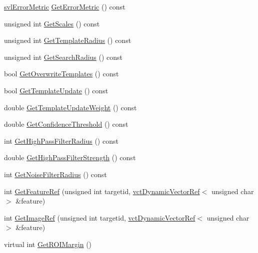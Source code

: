 \begin{DoxyCompactItemize}
\hyperlink{svl_definitions_8h_ade0b97ec3319ac710d7478dd2b608727}{svl\-Error\-Metric} \hyperlink{classsvl_tracker_m_s_brute_force_a05f84e1c56b6e77dc76cd3056a665ee8}{Get\-Error\-Metric} () const 
\item 
unsigned int \hyperlink{classsvl_tracker_m_s_brute_force_a3cd3d398b00a6ab8d6d0a90dcaa465b9}{Get\-Scales} () const 
\item 
unsigned int \hyperlink{classsvl_tracker_m_s_brute_force_ae144e2ee5ab88e36033c692e3a19beb7}{Get\-Template\-Radius} () const 
\item 
unsigned int \hyperlink{classsvl_tracker_m_s_brute_force_a78dc2245729b8d9202613fd6e01513ea}{Get\-Search\-Radius} () const 
\item 
bool \hyperlink{classsvl_tracker_m_s_brute_force_aa740599c31b39776bd4c2ba857439083}{Get\-Overwrite\-Templates} () const 
\item 
bool \hyperlink{classsvl_tracker_m_s_brute_force_aaf206f8acad3a3e4ef2b46dcf8ec7059}{Get\-Template\-Update} () const 
\item 
double \hyperlink{classsvl_tracker_m_s_brute_force_abf556900111a4553a5ae1bd53e7aaa9c}{Get\-Template\-Update\-Weight} () const 
\item 
double \hyperlink{classsvl_tracker_m_s_brute_force_abf7d49bbc65882beded0e10f8012021e}{Get\-Confidence\-Threshold} () const 
\item 
int \hyperlink{classsvl_tracker_m_s_brute_force_a33ca45d65c70cf67ff1ec95e5619c621}{Get\-High\-Pass\-Filter\-Radius} () const 
\item 
double \hyperlink{classsvl_tracker_m_s_brute_force_aec76782c9c8ad66498c6a4f500f29487}{Get\-High\-Pass\-Filter\-Strength} () const 
\item 
int \hyperlink{classsvl_tracker_m_s_brute_force_a7f5ece0f04822b9d4972b3b1cd512279}{Get\-Noise\-Filter\-Radius} () const 
\item 
int \hyperlink{classsvl_tracker_m_s_brute_force_a629b3924d8de4f652def1e2c2bb169e5}{Get\-Feature\-Ref} (unsigned int targetid, \hyperlink{classvct_dynamic_vector_ref}{vct\-Dynamic\-Vector\-Ref}$<$ unsigned char $>$ \&feature)
\item 
int \hyperlink{classsvl_tracker_m_s_brute_force_a71e28e50e7805500aec9410a54949edc}{Get\-Image\-Ref} (unsigned int targetid, \hyperlink{classvct_dynamic_vector_ref}{vct\-Dynamic\-Vector\-Ref}$<$ unsigned char $>$ \&feature)
\item 
virtual int \hyperlink{classsvl_tracker_m_s_brute_force_afea3ca4f31862335eb7802627ec7bf5f}{Get\-R\-O\-I\-Margin} ()
\item 

\end{DoxyCompactItemize}
